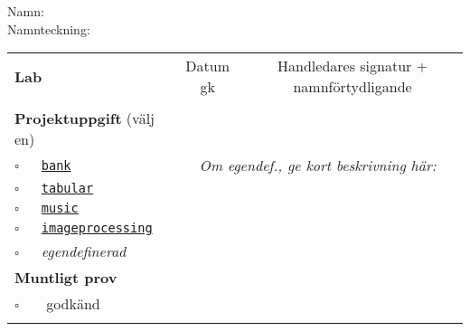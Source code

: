 \vspace{2.5em}\noindent Namn: \dotfill\\

\vspace{1em}\noindent Namnteckning: \dotfill\\

\newcommand{\LabRow}[1]{\\[-1.1em] \hyperref[section:lab:#1]{\texttt{#1}} & \dotfill &  \dotfill  \\ \addlinespace }

\begin{table}[h]
\vspace{1em}
\begin{tabular}{lcc}
\toprule \addlinespace
{\sffamily\bfseries\small Lab} & {\sffamily\small Datum gk} &	
{\sffamily\small Handledares signatur + namnförtydligande}\\ \addlinespace 
\\[-0.5em]

\addlinespace 
\addlinespace\addlinespace
{\sffamily\small {\bfseries Projektuppgift} (välj en)	} & \dotfill &  \dotfill  \\
\addlinespace\addlinespace %
{\Large$\square$}\texttt{~~~\hyperref[section:proj:bank]{bank}} &
\multicolumn{2}{c}{\textit{Om egendef., ge kort beskrivning här:}}  \\ \addlinespace
{\Large$\square$}\texttt{~~~\hyperref[section:proj:tabular]{tabular}} \\ \addlinespace
{\Large$\square$}\texttt{~~~\hyperref[section:proj:music]{music}} \\ \addlinespace
{\Large$\square$}\texttt{~~~\hyperref[section:proj:imageprocessing]{imageprocessing}}  \\ \addlinespace
{\Large$\square$}\texttt{~~~}\textit{egendefinerad}  \\
\addlinespace\addlinespace
\addlinespace
{\sffamily\small {\bfseries Muntligt prov}} &  & \\
\addlinespace\addlinespace{}
{\Large$\square$}\texttt{~~~} godkänd & \dotfill &  \dotfill \\
\addlinespace\addlinespace\bottomrule
\end{tabular}
\end{table}
